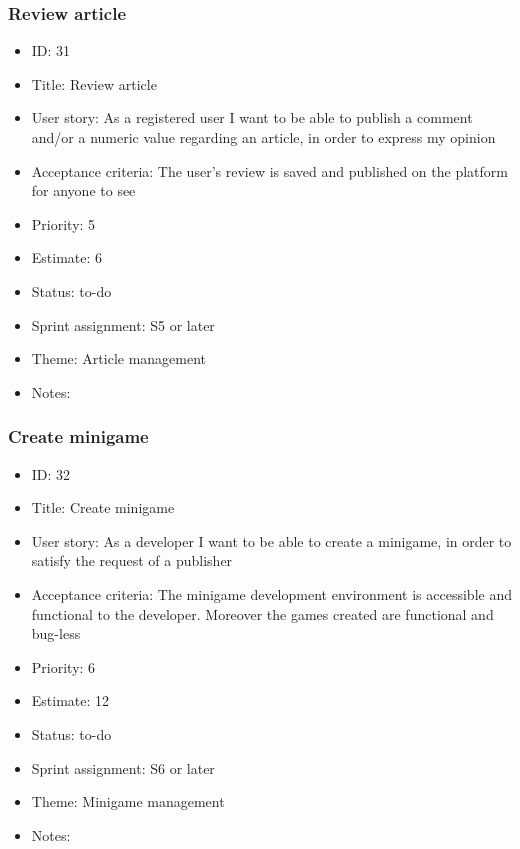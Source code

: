 \subsubsection{Review article}
\begin{itemize}
	\item ID: 31
	\item Title: Review article
	\item User story: As a registered user I want to be able to publish a comment and/or a numeric value regarding an article, in order to express my opinion
	\item Acceptance criteria: The user's review is saved and published on the platform for anyone to see
	\item Priority: 5
	\item Estimate: 6
	\item Status: to-do
	\item Sprint assignment: S5 or later
	\item Theme: Article management
	\item Notes:
\end{itemize}

\subsubsection{Create minigame}
\begin{itemize}
	\item ID: 32
	\item Title: Create minigame
	\item User story: As a developer I want to be able to create a minigame, in order to satisfy the request of a publisher
	\item Acceptance criteria: The minigame development environment is accessible and functional to the developer. Moreover the games created are functional and bug-less
	\item Priority: 6
	\item Estimate: 12
	\item Status: to-do
	\item Sprint assignment: S6 or later
	\item Theme: Minigame management
	\item Notes:
\end{itemize}

